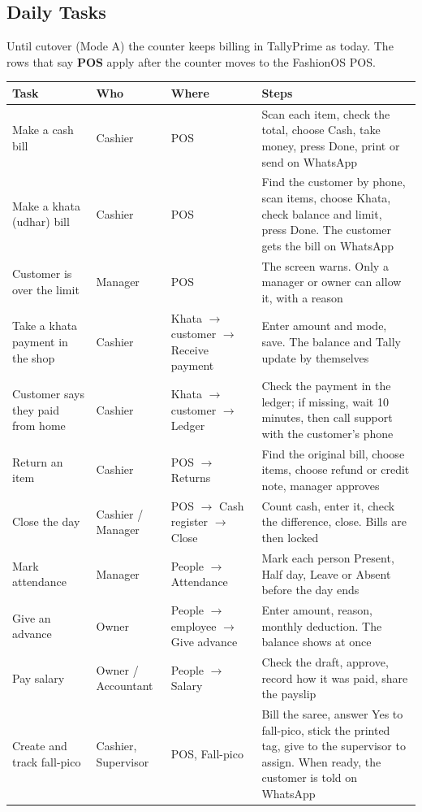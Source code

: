 \documentclass[11pt,a4paper]{article}
\newcommand{\hdr}{\rowcolor{hdrgray}\bfseries}
\newenvironment{note}{\begin{tcolorbox}[colback=yellow!8,colframe=orange!60!black,boxrule=0.5pt,left=4pt,right=4pt,top=3pt,bottom=3pt]}{\end{tcolorbox}}
\begin{document}
\subsection{Daily Tasks}
\begin{note}
Until cutover (Mode A) the counter keeps billing in TallyPrime as today. The rows that say \textbf{POS} apply after the counter moves to the FashionOS POS.
\end{note}
{\small
\begin{longtable}{L{2.8cm}L{1.8cm}L{3.2cm}L{8.7cm}}
\hdr Task & Who & Where & Steps \\ \endhead
Make a cash bill & Cashier & POS & Scan each item, check the total, choose Cash, take money, press Done, print or send on WhatsApp \\
Make a khata (udhar) bill & Cashier & POS & Find the customer by phone, scan items, choose Khata, check balance and limit, press Done. The customer gets the bill on WhatsApp \\
Customer is over the limit & Manager & POS & The screen warns. Only a manager or owner can allow it, with a reason \\
Take a khata payment in the shop & Cashier & Khata $\rightarrow$ customer $\rightarrow$ Receive payment & Enter amount and mode, save. The balance and Tally update by themselves \\
Customer says they paid from home & Cashier & Khata $\rightarrow$ customer $\rightarrow$ Ledger & Check the payment in the ledger; if missing, wait 10 minutes, then call support with the customer's phone \\
Return an item & Cashier & POS $\rightarrow$ Returns & Find the original bill, choose items, choose refund or credit note, manager approves \\
Close the day & Cashier / Manager & POS $\rightarrow$ Cash register $\rightarrow$ Close & Count cash, enter it, check the difference, close. Bills are then locked \\
Mark attendance & Manager & People $\rightarrow$ Attendance & Mark each person Present, Half day, Leave or Absent before the day ends \\
Give an advance & Owner & People $\rightarrow$ employee $\rightarrow$ Give advance & Enter amount, reason, monthly deduction. The balance shows at once \\
Pay salary & Owner / Accountant & People $\rightarrow$ Salary & Check the draft, approve, record how it was paid, share the payslip \\
Create and track fall-pico & Cashier, Supervisor & POS, Fall-pico & Bill the saree, answer Yes to fall-pico, stick the printed tag, give to the supervisor to assign. When ready, the customer is told on WhatsApp \\

\end{longtable}}
\end{document}

